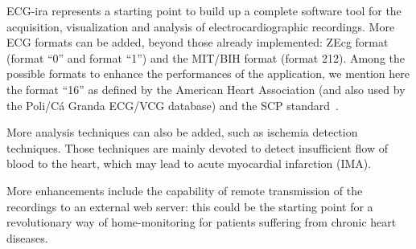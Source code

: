 ECG-ira represents a starting point to build up a complete software tool for the acquisition, visualization and analysis of electrocardiographic recordings. More ECG formats can be added, beyond those already implemented: ZEcg format (format ``0'' and format ``1'') and the MIT/BIH format (format 212). Among the possible formats to enhance the performances of the application, we mention here the format ``16'' as defined by the American Heart Association (and also used by the Poli/C\'a Granda ECG/VCG database) and the SCP standard~\cite{ref28}.

More analysis techniques can also be added, such as ischemia detection techniques. Those techniques are mainly devoted to detect insufficient flow of blood to the heart, which may lead to acute myocardial infarction (IMA).

More enhancements include the capability of remote transmission of the recordings to an external web server: this could be the starting point for a revolutionary way of home-monitoring for patients suffering from chronic heart diseases.
